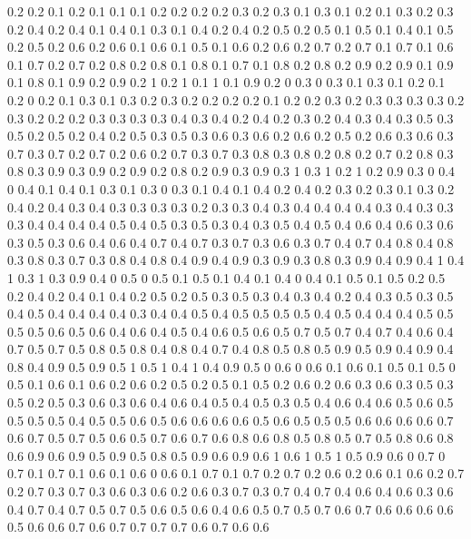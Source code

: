 0.2 0.2
0.1 0.2
0.1 0.1
0.1 0.2
0.2 0.2
0.2 0.3
0.2 0.3
0.1 0.3
0.1 0.2
0.1 0.3
0.2 0.3
0.2 0.4
0.2 0.4
0.1 0.4
0.1 0.3
0.1 0.4
0.2 0.4
0.2 0.5
0.2 0.5
0.1 0.5
0.1 0.4
0.1 0.5
0.2 0.5
0.2 0.6
0.2 0.6
0.1 0.6
0.1 0.5
0.1 0.6
0.2 0.6
0.2 0.7
0.2 0.7
0.1 0.7
0.1 0.6
0.1 0.7
0.2 0.7
0.2 0.8
0.2 0.8
0.1 0.8
0.1 0.7
0.1 0.8
0.2 0.8
0.2 0.9
0.2 0.9
0.1 0.9
0.1 0.8
0.1 0.9
0.2 0.9
0.2 1
0.2 1
0.1 1
0.1 0.9
0.2 0
0.3 0
0.3 0.1
0.3 0.1
0.2 0.1
0.2 0
0.2 0.1
0.3 0.1
0.3 0.2
0.3 0.2
0.2 0.2
0.2 0.1
0.2 0.2
0.3 0.2
0.3 0.3
0.3 0.3
0.2 0.3
0.2 0.2
0.2 0.3
0.3 0.3
0.3 0.4
0.3 0.4
0.2 0.4
0.2 0.3
0.2 0.4
0.3 0.4
0.3 0.5
0.3 0.5
0.2 0.5
0.2 0.4
0.2 0.5
0.3 0.5
0.3 0.6
0.3 0.6
0.2 0.6
0.2 0.5
0.2 0.6
0.3 0.6
0.3 0.7
0.3 0.7
0.2 0.7
0.2 0.6
0.2 0.7
0.3 0.7
0.3 0.8
0.3 0.8
0.2 0.8
0.2 0.7
0.2 0.8
0.3 0.8
0.3 0.9
0.3 0.9
0.2 0.9
0.2 0.8
0.2 0.9
0.3 0.9
0.3 1
0.3 1
0.2 1
0.2 0.9
0.3 0
0.4 0
0.4 0.1
0.4 0.1
0.3 0.1
0.3 0
0.3 0.1
0.4 0.1
0.4 0.2
0.4 0.2
0.3 0.2
0.3 0.1
0.3 0.2
0.4 0.2
0.4 0.3
0.4 0.3
0.3 0.3
0.3 0.2
0.3 0.3
0.4 0.3
0.4 0.4
0.4 0.4
0.3 0.4
0.3 0.3
0.3 0.4
0.4 0.4
0.4 0.5
0.4 0.5
0.3 0.5
0.3 0.4
0.3 0.5
0.4 0.5
0.4 0.6
0.4 0.6
0.3 0.6
0.3 0.5
0.3 0.6
0.4 0.6
0.4 0.7
0.4 0.7
0.3 0.7
0.3 0.6
0.3 0.7
0.4 0.7
0.4 0.8
0.4 0.8
0.3 0.8
0.3 0.7
0.3 0.8
0.4 0.8
0.4 0.9
0.4 0.9
0.3 0.9
0.3 0.8
0.3 0.9
0.4 0.9
0.4 1
0.4 1
0.3 1
0.3 0.9
0.4 0
0.5 0
0.5 0.1
0.5 0.1
0.4 0.1
0.4 0
0.4 0.1
0.5 0.1
0.5 0.2
0.5 0.2
0.4 0.2
0.4 0.1
0.4 0.2
0.5 0.2
0.5 0.3
0.5 0.3
0.4 0.3
0.4 0.2
0.4 0.3
0.5 0.3
0.5 0.4
0.5 0.4
0.4 0.4
0.4 0.3
0.4 0.4
0.5 0.4
0.5 0.5
0.5 0.5
0.4 0.5
0.4 0.4
0.4 0.5
0.5 0.5
0.5 0.6
0.5 0.6
0.4 0.6
0.4 0.5
0.4 0.6
0.5 0.6
0.5 0.7
0.5 0.7
0.4 0.7
0.4 0.6
0.4 0.7
0.5 0.7
0.5 0.8
0.5 0.8
0.4 0.8
0.4 0.7
0.4 0.8
0.5 0.8
0.5 0.9
0.5 0.9
0.4 0.9
0.4 0.8
0.4 0.9
0.5 0.9
0.5 1
0.5 1
0.4 1
0.4 0.9
0.5 0
0.6 0
0.6 0.1
0.6 0.1
0.5 0.1
0.5 0
0.5 0.1
0.6 0.1
0.6 0.2
0.6 0.2
0.5 0.2
0.5 0.1
0.5 0.2
0.6 0.2
0.6 0.3
0.6 0.3
0.5 0.3
0.5 0.2
0.5 0.3
0.6 0.3
0.6 0.4
0.6 0.4
0.5 0.4
0.5 0.3
0.5 0.4
0.6 0.4
0.6 0.5
0.6 0.5
0.5 0.5
0.5 0.4
0.5 0.5
0.6 0.5
0.6 0.6
0.6 0.6
0.5 0.6
0.5 0.5
0.5 0.6
0.6 0.6
0.6 0.7
0.6 0.7
0.5 0.7
0.5 0.6
0.5 0.7
0.6 0.7
0.6 0.8
0.6 0.8
0.5 0.8
0.5 0.7
0.5 0.8
0.6 0.8
0.6 0.9
0.6 0.9
0.5 0.9
0.5 0.8
0.5 0.9
0.6 0.9
0.6 1
0.6 1
0.5 1
0.5 0.9
0.6 0
0.7 0
0.7 0.1
0.7 0.1
0.6 0.1
0.6 0
0.6 0.1
0.7 0.1
0.7 0.2
0.7 0.2
0.6 0.2
0.6 0.1
0.6 0.2
0.7 0.2
0.7 0.3
0.7 0.3
0.6 0.3
0.6 0.2
0.6 0.3
0.7 0.3
0.7 0.4
0.7 0.4
0.6 0.4
0.6 0.3
0.6 0.4
0.7 0.4
0.7 0.5
0.7 0.5
0.6 0.5
0.6 0.4
0.6 0.5
0.7 0.5
0.7 0.6
0.7 0.6
0.6 0.6
0.6 0.5
0.6 0.6
0.7 0.6
0.7 0.7
0.7 0.7
0.6 0.7
0.6 0.6
